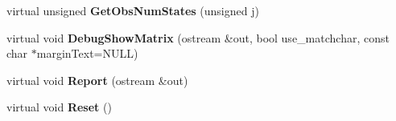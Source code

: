 \begin{DoxyCompactItemize}
\item 
\hypertarget{classNxsCharactersBlock_abcb7a058864974a71803856ac008f76a}{
virtual unsigned {\bfseries GetObsNumStates} (unsigned j)}
\label{classNxsCharactersBlock_abcb7a058864974a71803856ac008f76a}

\item 
\hypertarget{classNxsCharactersBlock_a6454d17f2bed1a5355f7b068362fbea0}{
virtual void {\bfseries DebugShowMatrix} (ostream \&out, bool use\_\-matchchar, const char $\ast$marginText=NULL)}
\label{classNxsCharactersBlock_a6454d17f2bed1a5355f7b068362fbea0}

\item 
\hypertarget{classNxsCharactersBlock_a13ed7f2a0dfbbdae5d62905232ccfe61}{
virtual void {\bfseries Report} (ostream \&out)}
\label{classNxsCharactersBlock_a13ed7f2a0dfbbdae5d62905232ccfe61}

\item 
\hypertarget{classNxsCharactersBlock_a2e479f3c7a744057e5ee3e653f9061e9}{
virtual void {\bfseries Reset} ()}
\label{classNxsCharactersBlock_a2e479f3c7a744057e5ee3e653f9061e9}

\end{DoxyCompactItemize}
